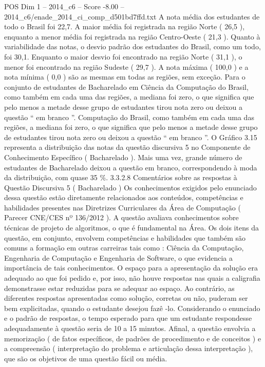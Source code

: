 \begin{textsample}{POS Dim 1 – 2014\_c6 – Score -8.00 – 2014\_c6/enade\_2014\_ci\_comp\_d501bd7ffd.txt}
A nota média dos estudantes de todo o Brasil foi 22,7.
A maior média foi registrada na região Norte ( 26,5 ), enquanto a menor média foi registrada na região Centro-Oeste ( 21,3 ).
Quanto à variabilidade das notas, o desvio padrão dos estudantes do Brasil, como um todo, foi 30,1.
Enquanto o maior desvio foi encontrado na região Norte ( 31,1 ), o menor foi encontrado na região Sudeste ( 29,7 ).
A nota máxima ( 100,0 ) e a nota mínima ( 0,0 ) são as mesmas em todas as regiões, sem exceção.
Para o conjunto de estudantes de Bacharelado em Ciência da Computação do Brasil, como também em cada uma das regiões, a mediana foi zero, o que significa que pelo menos a metade desse grupo de estudantes tirou nota zero ou deixou a questão “ em branco ”.
Computação do Brasil, como também em cada uma das regiões, a mediana foi zero, o que significa que pelo menos a metade desse grupo de estudantes tirou nota zero ou deixou a questão “ em branco ”.
O Gráfico 3.15 representa a distribuição das notas da questão discursiva 5 no Componente de Conhecimento Específico ( Bacharelado ).
Mais uma vez, grande número de estudantes de Bacharelado deixou a questão em branco, correspondendo à moda da distribuição, com quase 35 \%. 3.3.2.8 Comentários sobre as respostas à Questão Discursiva 5 ( Bacharelado ) Os conhecimentos exigidos pelo enunciado dessa questão estão diretamente relacionados aos conteúdos, competências e habilidades presentes nas Diretrizes Curriculares da Área de Computação ( Parecer CNE/CES nº 136/2012 ).
A questão avaliava conhecimentos sobre técnicas de projeto de algoritmos, o que é fundamental na Área.
Os dois itens da questão, em conjunto, envolvem competências e habilidades que também são comuns a formação em outras carreiras tais como : Ciência da Computação, Engenharia de Computação e Engenharia de Software, o que evidencia a importância de tais conhecimentos.
O espaço para a apresentação da solução era adequado ao que foi pedido e, por isso, não houve respostas nas quais a caligrafia demonstrasse estar reduzidas para se adequar ao espaço.
Ao contrário, as diferentes respostas apresentadas como solução, corretas ou não, puderam ser bem explicitadas, quando o estudante desejou fazê -lo.
Considerando o enunciado e o padrão de respostas, o tempo esperado para que um estudante respondesse adequadamente à questão seria de 10 a 15 minutos.
Afinal, a questão envolvia a memorização ( de fatos específicos, de padrões de procedimento e de conceitos ) e a compreensão ( interpretação do problema e articulação dessa interpretação ), que são os objetivos de uma questão fácil ou média.

\end{textsample}
